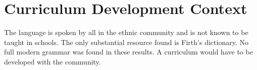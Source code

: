\documentclass[12pt]{article}
\begin{document}
\section{Curriculum Development Context}
The language is spoken by all in the ethnic community and is not known to be taught in schools. The only substantial resource found is Firth's dictionary. No full modern grammar was found in these results. A curriculum would have to be developed with the community.
\end{document}

